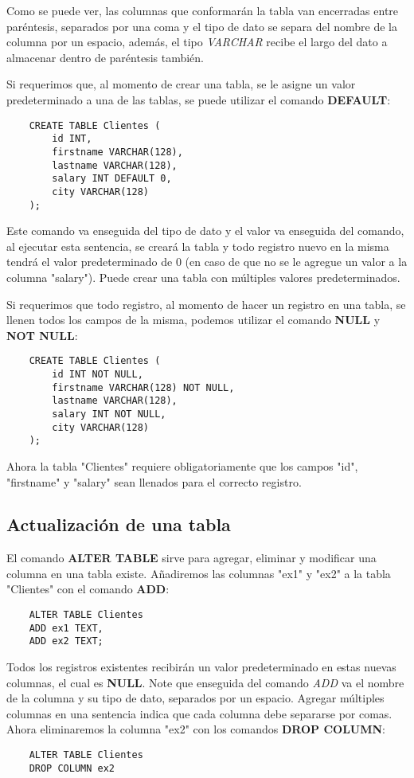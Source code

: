 Como se puede ver, las columnas que conformarán la tabla van encerradas entre paréntesis, separados por una coma y el tipo de dato se separa del nombre de la columna por un espacio, además, el tipo \textit{VARCHAR} recibe el largo del dato a almacenar dentro de paréntesis también.

Si requerimos que, al momento de crear una tabla, se le asigne un valor predeterminado a una de las tablas, se puede utilizar el comando \textbf{DEFAULT}:
\begin{lstlisting}
    CREATE TABLE Clientes (
        id INT,
        firstname VARCHAR(128),
        lastname VARCHAR(128),
        salary INT DEFAULT 0,
        city VARCHAR(128)
    );
\end{lstlisting}

Este comando va enseguida del tipo de dato y el valor va enseguida del comando, al ejecutar esta sentencia, se creará la tabla y todo registro nuevo en la misma tendrá el valor predeterminado de 0 (en caso de que no se le agregue un valor a la columna "salary"). Puede crear una tabla con múltiples valores predeterminados.

Si requerimos que todo registro, al momento de hacer un registro en una tabla, se llenen todos los campos de la misma, podemos utilizar el comando \textbf{NULL} y \textbf{NOT NULL}:
\begin{lstlisting}
    CREATE TABLE Clientes (
        id INT NOT NULL,
        firstname VARCHAR(128) NOT NULL,
        lastname VARCHAR(128),
        salary INT NOT NULL,
        city VARCHAR(128)
    );
\end{lstlisting}

Ahora la tabla "Clientes" requiere obligatoriamente que los campos "id", "firstname" y "salary" sean llenados para el correcto registro.


\subsection{Actualización de una tabla}

El comando \textbf{ALTER TABLE} sirve para agregar, eliminar y modificar una columna en una tabla existe. Añadiremos las columnas "ex1" y "ex2" a la tabla "Clientes" con el comando \textbf{ADD}:
\begin{lstlisting}
    ALTER TABLE Clientes
    ADD ex1 TEXT,
    ADD ex2 TEXT;
\end{lstlisting}

Todos los registros existentes recibirán un valor predeterminado en estas nuevas columnas, el cual es \textbf{NULL}. Note que enseguida del comando \textit{ADD} va el nombre de la columna y su tipo de dato, separados por un espacio. Agregar múltiples columnas en una sentencia indica que cada columna debe separarse por comas. Ahora eliminaremos la columna "ex2" con los comandos \textbf{DROP COLUMN}:
\begin{lstlisting}
    ALTER TABLE Clientes
    DROP COLUMN ex2
\end{lstlisting}

